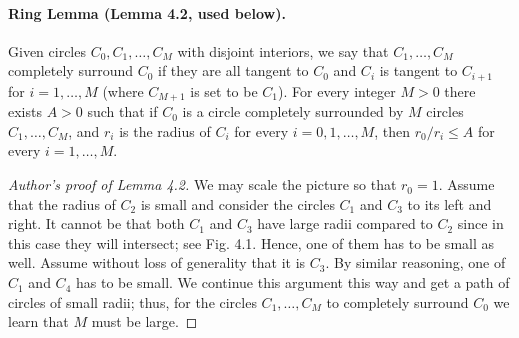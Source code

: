 \documentclass[UTF8,11pt]{ctexart}
\theoremstyle{definition}
\begin{document}
\paragraph{Ring Lemma (Lemma 4.2, used below).}
Given circles $C_0,C_1,\ldots,C_M$ with disjoint interiors, we say that $C_1,\ldots,C_M$ completely surround $C_0$ if they are all tangent to $C_0$ and $C_i$ is tangent to $C_{i+1}$ for $i=1,\ldots,M$ (where $C_{M+1}$ is set to be $C_1$).
For every integer $M>0$ there exists $A>0$ such that if $C_0$ is a circle completely surrounded by $M$ circles $C_1,\ldots,C_M$, and $r_i$ is the radius of $C_i$ for every $i=0,1,\ldots,M$, then $r_0/r_i\le A$ for every $i=1,\ldots,M$.
\begin{proof}[Author's proof of Lemma 4.2]
We may scale the picture so that $r_0=1$. Assume that the radius of $C_2$ is small and consider the circles $C_1$ and $C_3$ to its left and right. It cannot be that both $C_1$ and $C_3$ have large radii compared to $C_2$ since in this case they will intersect; see Fig. 4.1. Hence, one of them has to be small as well. Assume without loss of generality that it is $C_3$. By similar reasoning, one of $C_1$ and $C_4$ has to be small. We continue this argument this way and get a path of circles of small radii; thus, for the circles $C_1,\ldots,C_M$ to completely surround $C_0$ we learn that $M$ must be large.
\end{proof}
\end{document}
